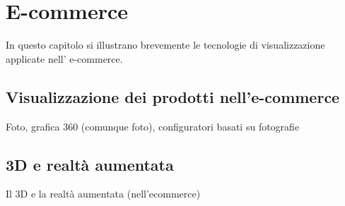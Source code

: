 \chapter{E-commerce}
\label{chap:ecommerce}
In questo capitolo si illustrano brevemente le tecnologie di visualizzazione applicate nell' e-commerce.

\section{Visualizzazione dei prodotti nell'e-commerce}
Foto, grafica 360 (comunque foto), configuratori basati su fotografie

\section{3D e realtà aumentata}
Il 3D e la realtà aumentata (nell'ecommerce)